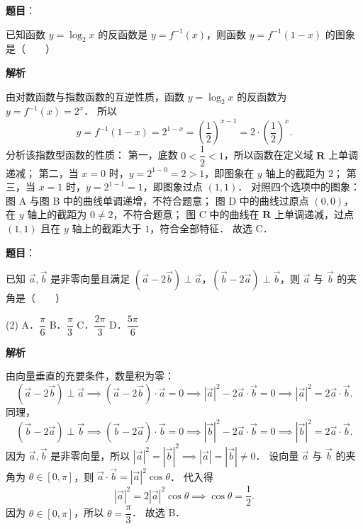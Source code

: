 \begin{answer}

\textbf{题目}：

已知函数 $y = \log_2 x$ 的反函数是 $y = f^{-1}(x)$，则函数 $y = f^{-1}(1 - x)$ 的图象是\mbox{（　　）}
\nopagebreak[4]
\begin{center}\end{center}
\nopagebreak[4]
\textbf{解析}
\nopagebreak[4]
\begin{center}\end{center}
\nopagebreak[4]
由对数函数与指数函数的互逆性质，函数 $y = \log_2 x$ 的反函数为 $y = f^{-1}(x) = 2^x$．
所以
\nopagebreak[4]
\[
y = f^{-1}(1 - x) = 2^{1 - x} = \left(\frac{1}{2}\right)^{x - 1} = 2 \cdot \left(\frac{1}{2}\right)^x.
\]
分析该指数型函数的性质：
第一，底数 $0 < \dfrac{1}{2} < 1$，所以函数在定义域 $\mathbf{R}$ 上单调递减；
第二，当 $x = 0$ 时，$y = 2^{1 - 0} = 2 > 1$，即图象在 $y$ 轴上的截距为 $2$；
第三，当 $x = 1$ 时，$y = 2^{1 - 1} = 1$，即图象过点 $(1, 1)$．
对照四个选项中的图象：
图 A 与图 B 中的曲线单调递增，不符合题意；
图 D 中的曲线过原点 $(0, 0)$，在 $y$ 轴上的截距为 $0 \neq 2$，不符合题意；
图 C 中的曲线在 $\mathbf{R}$ 上单调递减，过点 $(1, 1)$ 且在 $y$ 轴上的截距大于 $1$，符合全部特征．
故选 C．


\end{answer}
\begin{answer}

\textbf{题目}：

已知 $\vec{a}, \vec{b}$ 是非零向量且满足 $(\vec{a} - 2\vec{b}) \perp \vec{a}$，$(\vec{b} - 2\vec{a}) \perp \vec{b}$，则 $\vec{a}$ 与 $\vec{b}$ 的夹角是\mbox{（　　）}

\begin{gkopts}(2)
\task A．$\dfrac{\pi}{6}$
\task B．$\dfrac{\pi}{3}$
\task C．$\dfrac{2\pi}{3}$
\task D．$\dfrac{5\pi}{6}$
\end{gkopts}

\textbf{解析}

由向量垂直的充要条件，数量积为零：
\nopagebreak[4]
\[
(\vec{a} - 2\vec{b}) \perp \vec{a} \implies (\vec{a} - 2\vec{b}) \cdot \vec{a} = 0 \implies |\vec{a}|^2 - 2\vec{a}\cdot\vec{b} = 0 \implies |\vec{a}|^2 = 2\vec{a}\cdot\vec{b}.
\]
同理，
\nopagebreak[4]
\[
(\vec{b} - 2\vec{a}) \perp \vec{b} \implies (\vec{b} - 2\vec{a}) \cdot \vec{b} = 0 \implies |\vec{b}|^2 - 2\vec{a}\cdot\vec{b} = 0 \implies |\vec{b}|^2 = 2\vec{a}\cdot\vec{b}.
\]
因为 $\vec{a}, \vec{b}$ 是非零向量，所以 $|\vec{a}|^2 = |\vec{b}|^2 \implies |\vec{a}| = |\vec{b}| \neq 0$．
设向量 $\vec{a}$ 与 $\vec{b}$ 的夹角为 $\theta \in [0, \pi]$，则 $\vec{a}\cdot\vec{b} = |\vec{a}|^2 \cos\theta$．
代入得
\nopagebreak[4]
\[
|\vec{a}|^2 = 2|\vec{a}|^2 \cos\theta \implies \cos\theta = \frac{1}{2}.
\]
因为 $\theta \in [0, \pi]$，所以 $\theta = \dfrac{\pi}{3}$．
故选 B．


\end{answer}

